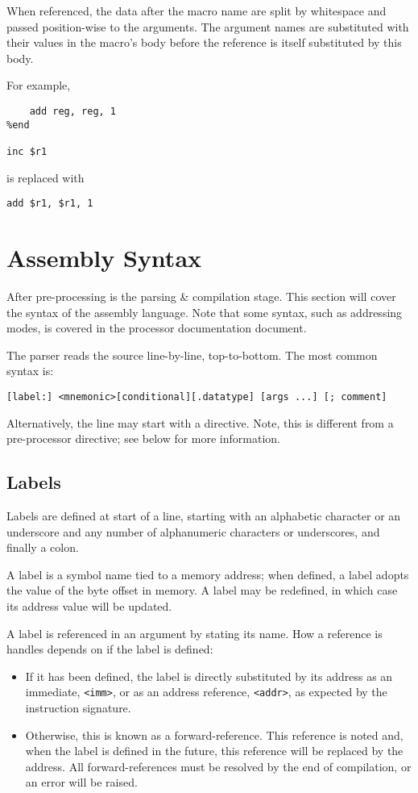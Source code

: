 \documentclass{article}
\begin{document}
When referenced, the data after the macro name are split by whitespace and passed position-wise to the arguments.
The argument names are substituted with their values in the macro's body before the reference is itself substituted by this body.

For example,

\begin{lstlisting}[style=assembly]
%macro inc reg
    add reg, reg, 1
%end

inc $r1
\end{lstlisting}

is replaced with

\begin{lstlisting}[style=assembly]
add $r1, $r1, 1
\end{lstlisting}

\section{Assembly Syntax}

After pre-processing is the parsing \& compilation stage.
This section will cover the syntax of the assembly language.
Note that some syntax, such as addressing modes, is covered in the processor documentation document.

The parser reads the source line-by-line, top-to-bottom.
The most common syntax is:

\begin{lstlisting}[style=assembly]
[label:] <mnemonic>[conditional][.datatype] [args ...] [; comment]
\end{lstlisting}

Alternatively, the line may start with a directive.
Note, this is different from a pre-processor directive; see below for more information.

\subsection{Labels}

Labels are defined at start of a line, starting with an alphabetic character or an underscore and any number of alphanumeric characters or underscores, and finally a colon.

A label is a symbol name tied to a memory address; when defined, a label adopts the value of the byte offset in memory.
A label may be redefined, in which case its address value will be updated.

A label is referenced in an argument by stating its name.
How a reference is handles depends on if the label is defined:
\begin{itemize}
    \item If it has been defined, the label is directly substituted by its address as an immediate, \texttt{<imm>}, or as an address reference, \texttt{<addr>}, as expected by the instruction signature.
    \item Otherwise, this is known as a forward-reference.
    This reference is noted and, when the label is defined in the future, this reference will be replaced by the address.
    All forward-references must be resolved by the end of compilation, or an error will be raised.
\end{itemize}
\end{document}
